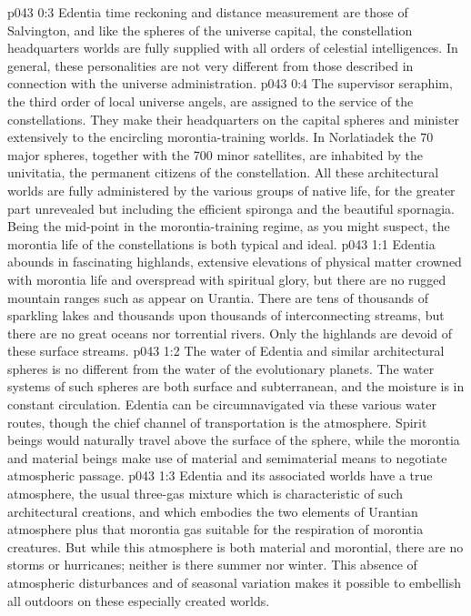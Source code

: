 \vs p043 0:3 \pc Edentia time reckoning and distance measurement are those of Salvington, and like the spheres of the universe capital, the constellation headquarters worlds are fully supplied with all orders of celestial intelligences. In general, these personalities are not very different from those described in connection with the universe administration.
\vs p043 0:4 The supervisor seraphim, the third order of local universe angels, are assigned to the service of the constellations. They make their headquarters on the capital spheres and minister extensively to the encircling morontia\hyp{}training worlds. In Norlatiadek the 70 major spheres, together with the 700 minor satellites, are inhabited by the univitatia, the permanent citizens of the constellation. All these architectural worlds are fully administered by the various groups of native life, for the greater part unrevealed but including the efficient spironga and the beautiful spornagia. Being the mid\hyp{}point in the morontia\hyp{}training regime, as you might suspect, the morontia life of the constellations is both typical and ideal.
\vs p043 1:1 Edentia abounds in fascinating highlands, extensive elevations of physical matter crowned with morontia life and overspread with spiritual glory, but there are no rugged mountain ranges such as appear on Urantia. There are tens of thousands of sparkling lakes and thousands upon thousands of interconnecting streams, but there are no great oceans nor torrential rivers. Only the highlands are devoid of these surface streams.
\vs p043 1:2 The water of Edentia and similar architectural spheres is no different from the water of the evolutionary planets. The water systems of such spheres are both surface and subterranean, and the moisture is in constant circulation. Edentia can be circumnavigated via these various water routes, though the chief channel of transportation is the atmosphere. Spirit beings would naturally travel above the surface of the sphere, while the morontia and material beings make use of material and semimaterial means to negotiate atmospheric passage.
\vs p043 1:3 Edentia and its associated worlds have a true atmosphere, the usual three\hyp{}gas mixture which is characteristic of such architectural creations, and which embodies the two elements of Urantian atmosphere plus that morontia gas suitable for the respiration of morontia creatures. But while this atmosphere is both material and morontial, there are no storms or hurricanes; neither is there summer nor winter. This absence of atmospheric disturbances and of seasonal variation makes it possible to embellish all outdoors on these especially created worlds.
